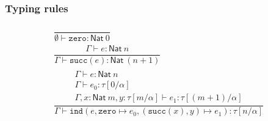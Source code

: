 \documentclass[10pt]{article}
\newcommand{\ind}[5]{\texttt{ind}(#1, \texttt{zero} \mapsto #2, (\texttt{succ}(#3), #4) \mapsto #5)}
\begin{document}
\subsubsection*{Typing rules}
\begin{align*}
\begin{array}{c}
\dfrac{}{\emptyset \vdash \texttt{zero} : \mathsf{Nat}\ 0}
\\[2em]
\dfrac{\Gamma \vdash e : \mathsf{Nat}\ n}{\Gamma \vdash \texttt{succ}(e) : \mathsf{Nat}\ (n+1)}
\\[2em]
\dfrac{\begin{array}{l}
       \Gamma \vdash e : \mathsf{Nat}\ n \\ \Gamma \vdash e_0 : \tau[0/\alpha] \\
        \Gamma, x : \mathsf{Nat}\ m, y : \tau[m/\alpha] \vdash e_1 : \tau[(m+1)/\alpha]\end{array}}
      {\Gamma \vdash \ind{e}{e_0}{x}{y}{e_1} : \tau[n/\alpha] }
\end{array}
\end{align*}
\end{document}
